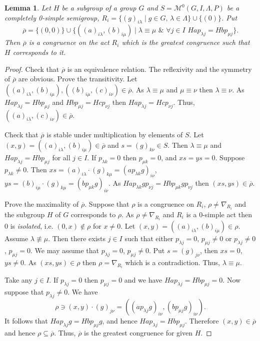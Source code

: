 \documentclass{birkau}
\numberwithin{equation}{section}
\theoremstyle{plain}
\newtheorem{lemma}[theorem]{Lemma}
\theoremstyle{definition}
\begin{document}
    \begin{lemma} \label{lemma:928}
        Let $H$ be a subgroup of a group $G$ and $S=\mathcal M^0 (G, I, \Lambda, P)$ be a completely 0-simple semigroup, $R_i=\{ (g)_{i\lambda} \mid g\in G, \, \lambda \in \Lambda \} \cup \{ (0) \}$. Put $$ \overline\rho = \{(0,0)\}\cup\{((a)_{i \lambda},(b)_{i\mu}) \mid \lambda \equiv \mu\,\, \& \,\,\forall j\in I \,\, Hap_{\lambda j}= Hbp_{\mu j} \}.$$ Then $\overline \rho$ is a congruence on the act $R_i$ which is the greatest congruence such that $H$ corresponds to it.
    \end{lemma}
    \begin{proof}
        Check that $\overline \rho$ is an equivalence relation. The reflexivity and the symmetry of $\overline \rho$ are obvious. Prove the transitivity. Let $((a)_{i\lambda}, (b)_{i\mu}), ((b)_{i\mu}, (c)_{i\nu}) \in \overline \rho$. As $\lambda \equiv \mu$ and $\mu \equiv \nu$ then $\lambda \equiv \nu$. As $Hap_{\lambda j} = Hbp_{\mu j}$ and $Hbp_{\mu j} = Hcp_{\nu j}$ then $Hap_{\lambda j} = Hcp_{\nu j}$. Thus, $((a)_{i\lambda}, (c)_{i\nu}) \in \overline \rho$.

        Check that $\overline \rho$ is stable under multiplication by elements of $S$. Let $(x, y) =  ((a)_{i\lambda}, (b)_{i\mu}) \in \overline \rho$ and $s= (g)_{k\nu} \in S$. Then $\lambda \equiv \mu$ and $Hap_{\lambda j}= Hbp_{\mu j}$ for all $j\in I$. If $p_{\lambda k}=0$ then $p_{\mu k}=0$, and $xs=ys=0$. Suppose $p_{\lambda k} \ne 0$. Then $xs= (a)_{i\lambda} \cdot (g)_{k\mu} = (ap_{\lambda k}g)_{i\nu}$, $ys= (b)_{i\mu} \cdot (g)_{k\mu} = (bp_{\mu k}g)_{i\nu}$. As $Hap_{\lambda k}gp_{\nu j}= Hbp_{\mu k}gp_{\nu j}$ then $(xs, ys)\in \overline \rho$.

        Prove the maximality of $\overline \rho$. Suppose that $\rho$ is a congruence on $R_i$, $\rho \ne \nabla_{R_i}$ and the subgroup $H$ of $G$ corresponds to $\rho$. As $\rho \ne \nabla_{R_i}$ and $R_i$ is a 0-simple act then 0 is {\it isolated}, i.e. $(0, x)\not\in \rho$ for $x\ne 0$. Let $(x, y)=  ((a)_{i\lambda}, (b)_{i\mu}) \in \rho$. Assume $\lambda \not \equiv \mu$. Then there exists $j\in I$ such that either $p_{\lambda j}=0$, $p_{\mu j}\ne 0$ or $p_{\lambda j} \ne 0$, $p_{\mu j}=0$. We may assume that $p_{\lambda j}=0$, $p_{\mu j}\ne 0$. Put $s= (g)_{j\nu}$, then $xs=0$, $ys \ne 0$. As $(xs,ys) \in \rho$ then $\rho=\nabla_{R_i}$ which is a contradiction. Thus, $\lambda \equiv \mu$.

        Take any $j\in I$. If $p_{\lambda j} =0$ then $p_{\mu j}=0$ and we have $Hap_{\lambda j}= Hbp_{\mu j}=0$. Now suppose that $p_{\lambda j} \ne 0$. We have
        $$ \rho \ni (x, y) \cdot (g)_{j\nu} = ((ap_{\lambda j}g)_{i\nu}, (bp_{\mu j}g)_{i\nu}).  $$
        It follows that $Hap_{\lambda j}g = Hbp_{\mu j}g$, and hence $Hap_{\lambda j} = Hbp_{\mu j}$. Therefore $(x,y) \in \overline{\rho}$ and hence $\rho \subseteq \overline \rho$. Thus, $\overline \rho$ is the greatest congruence for given $H$.
    \end{proof}
	
\end{document}
